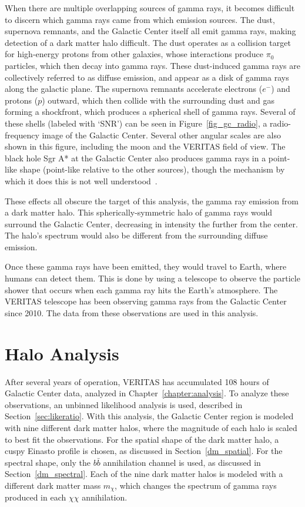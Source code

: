   When there are multiple overlapping sources of gamma rays, it becomes difficult to discern which gamma rays came from which emission sources.
  The dust, supernova remnants, and the Galactic Center itself all emit gamma rays, making detection of a dark matter halo difficult.
  The dust operates as a collision target for high-energy protons from other galaxies, whose interactions produce $\pi_0$ particles, which then decay into gamma rays.
  These dust-induced gamma rays are collectively referred to as diffuse emission, and appear as a disk of gamma rays along the galactic plane.
  The supernova remnants accelerate electrons ($e^{-}$) and protons ($p$) outward, which then collide with the surrounding dust and gas forming a shockfront, which produces a spherical shell of gamma rays.
  Several of these shells (labeled with `SNR') can be seen in Figure~\ref{fig_gc_radio}, a radio-frequency image of the Galactic Center.
  Several other angular scales are also shown in this figure, including the moon and the VERITAS field of view.
  The black hole Sgr A* at the Galactic Center also produces gamma rays in a point-like shape (point-like relative to the other sources), though the mechanism by which it does this is not well understood~\cite{gal_cent_still_undetermined}.

  These effects all obscure the target of this analysis, the gamma ray emission from a dark matter halo.
  This spherically-symmetric halo of gamma rays would surround the Galactic Center, decreasing in intensity the further from the center.
  The halo's spectrum would also be different from the surrounding diffuse emission.

  Once these gamma rays have been emitted, they would travel to Earth, where humans can detect them.
  This is done by using a telescope to observe the particle shower that occurs when each gamma ray hits the Earth's atmosphere.
  The VERITAS telescope has been observing gamma rays from the Galactic Center since 2010.
  The data from these observations are used in this analysis.

\FloatBarrier

\section{Halo Analysis}
  After several years of operation, VERITAS has accumulated 108 hours of Galactic Center data, analyzed in Chapter~\ref{chapter:analysis}.
  To analyze these observations, an unbinned likelihood analysis is used, described in Section~\ref{sec:likeratio}.
  With this analysis, the Galactic Center region is modeled with nine different dark matter halos, where the magnitude of each halo is scaled to best fit the observations.
  For the spatial shape of the dark matter halo, a cuspy Einasto profile is chosen, as discussed in Section~\ref{dm_spatial}.
  For the spectral shape, only the $b\bar{b}$ annihilation channel is used, as discussed in Section~\ref{dm_spectral}.
  Each of the nine dark matter halos is modeled with a different dark matter mass $m_{\chi}$, which changes the spectrum of gamma rays produced in each $\chi\chi$ annihilation.
  
